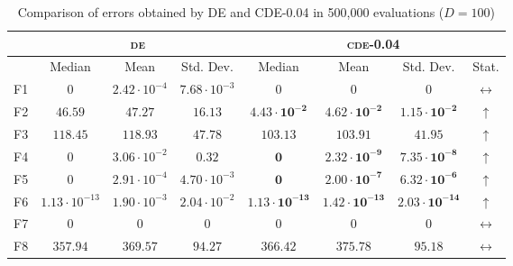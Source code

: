 \begin{table}[!t]
\caption{Comparison of errors obtained by \textsc{DE} and \textsc{CDE}-0.04 in 500,000 evaluations ($D = 100$)}
\label{tab:scalability_100}
\centering
\begin{scriptsize}
\begin{tabular}{c || c c c | c c c c}
\hline
 & \multicolumn{3}{|c|}{\textsc{de}} & \multicolumn{4}{|c}{\textsc{cde-0.04}} \\ \hline
    & Median                 & Mean                  & Std. Dev.             & Median                         & Mean                           & Std. Dev.                      & Stat. \\ \hline
F1  & $0$                    & $2.42 \cdot 10^{-4}$  & $7.68 \cdot 10^{-3}$  & $0$                            & $0$                            & $0$                            & $\leftrightarrow$\\ \hline
F2  & $46.59$                & $47.27$               & $16.13$               & $\mathbf{4.43 \cdot 10^{-2}}$  & $\mathbf{4.62 \cdot 10^{-2}}$  & $\mathbf{1.15 \cdot 10^{-2}}$  & $\uparrow$ \\ \hline
F3  & $118.45$               & $118.93$              & $47.78$               & $\mathbf{103.13}$              & $\mathbf{103.91}$              & $\mathbf{41.95}$               & $\uparrow$ \\ \hline
F4  & $0$                    & $3.06 \cdot 10^{-2}$  & $0.32$                & $\mathbf{0}$                   & $\mathbf{2.32 \cdot 10^{-9}}$  & $\mathbf{7.35 \cdot 10^{-8}}$  & $\uparrow$ \\ \hline
F5  & $0$                    & $2.91 \cdot 10^{-4}$  & $4.70 \cdot 10^{-3}$  & $\mathbf{0}$                   & $\mathbf{2.00 \cdot 10^{-7}}$  & $\mathbf{6.32 \cdot 10^{-6}}$  & $\uparrow$ \\ \hline
F6  & $1.13 \cdot 10^{-13}$  & $1.90 \cdot 10^{-3}$  & $2.04 \cdot 10^{-2}$  & $\mathbf{1.13 \cdot 10^{-13}}$ & $\mathbf{1.42 \cdot 10^{-13}}$ & $\mathbf{2.03 \cdot 10^{-14}}$ & $\uparrow$ \\ \hline
F7  & $0$                    & $0$                   & $0$                   & $0$                            & $0$                            & $0$                            & $\leftrightarrow$\\ \hline
F8  & $357.94$               & $369.57$              & $94.27$               & $366.42$                       & $375.78$                       & $95.18$                        & $\leftrightarrow$\\ \hline

\end{tabular}
\end{scriptsize}
\end{table}
